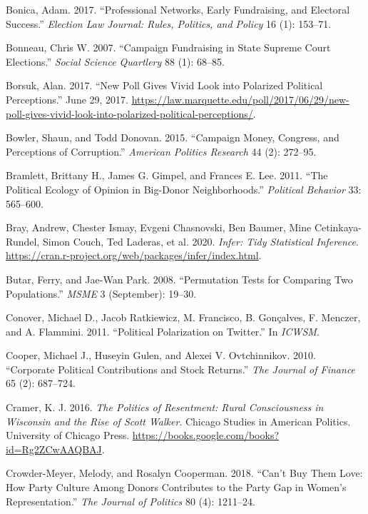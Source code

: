 \documentclass[12pt,]{article}
\begin{document}
\leavevmode\hypertarget{ref-bonica2017}{}%
Bonica, Adam. 2017. ``Professional Networks, Early Fundraising, and
Electoral Success.'' \emph{Election Law Journal: Rules, Politics, and
Policy} 16 (1): 153--71.

\leavevmode\hypertarget{ref-bonneau2007}{}%
Bonneau, Chris W. 2007. ``Campaign Fundraising in State Supreme Court
Elections.'' \emph{Social Science Quartlery} 88 (1): 68--85.

\leavevmode\hypertarget{ref-borsuk2017}{}%
Borsuk, Alan. 2017. ``New Poll Gives Vivid Look into Polarized Political
Perceptions.'' June 29, 2017.
\url{https://law.marquette.edu/poll/2017/06/29/new-poll-gives-vivid-look-into-polarized-political-perceptions/}.

\leavevmode\hypertarget{ref-bowler2015}{}%
Bowler, Shaun, and Todd Donovan. 2015. ``Campaign Money, Congress, and
Perceptions of Corruption.'' \emph{American Politics Research} 44 (2):
272--95.

\leavevmode\hypertarget{ref-bramlett2011}{}%
Bramlett, Brittany H., James G. Gimpel, and Frances E. Lee. 2011. ``The
Political Ecology of Opinion in Big-Donor Neighborhoods.''
\emph{Political Behavior} 33: 565--600.

\leavevmode\hypertarget{ref-infer}{}%
Bray, Andrew, Chester Ismay, Evgeni Chasnovski, Ben Baumer, Mine
Cetinkaya-Rundel, Simon Couch, Ted Laderas, et al. 2020. \emph{Infer:
Tidy Statistical Inference}.
\url{https://cran.r-project.org/web/packages/infer/index.html}.

\leavevmode\hypertarget{ref-butar2008}{}%
Butar, Ferry, and Jae-Wan Park. 2008. ``Permutation Tests for Comparing
Two Populations.'' \emph{MSME} 3 (September): 19--30.

\leavevmode\hypertarget{ref-conover2011}{}%
Conover, Michael D., Jacob Ratkiewicz, M. Francisco, B. Gonçalves, F.
Menczer, and A. Flammini. 2011. ``Political Polarization on Twitter.''
In \emph{ICWSM}.

\leavevmode\hypertarget{ref-cooper2010}{}%
Cooper, Michael J., Huseyin Gulen, and Alexei V. Ovtchinnikov. 2010.
``Corporate Political Contributions and Stock Returns.'' \emph{The
Journal of Finance} 65 (2): 687--724.

\leavevmode\hypertarget{ref-cramer2016}{}%
Cramer, K. J. 2016. \emph{The Politics of Resentment: Rural
Consciousness in Wisconsin and the Rise of Scott Walker}. Chicago
Studies in American Politics. University of Chicago Press.
\url{https://books.google.com/books?id=Rg2ZCwAAQBAJ}.

\leavevmode\hypertarget{ref-crowder-meyer2018}{}%
Crowder-Meyer, Melody, and Rosalyn Cooperman. 2018. ``Can't Buy Them
Love: How Party Culture Among Donors Contributes to the Party Gap in
Women's Representation.'' \emph{The Journal of Politics} 80 (4):
1211--24.
\end{document}
